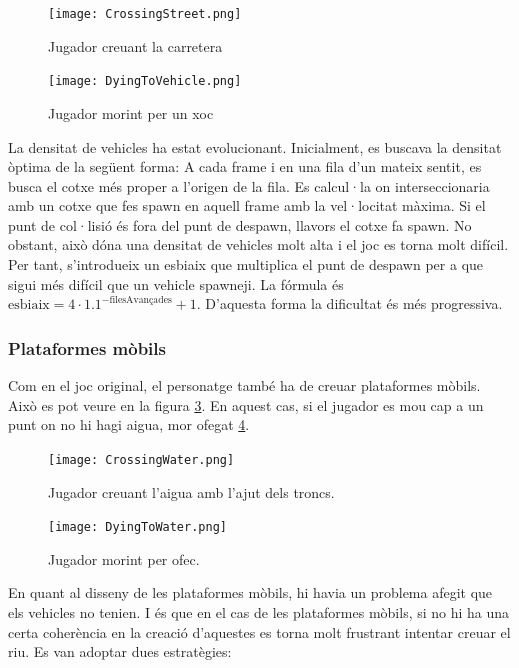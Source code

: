\documentclass{article}
\begin{document}
\begin{figure}[h!]
	\texttt{[image: CrossingStreet.png]}
	\caption{Jugador creuant la carretera}
	\label{creuantCarretera}
\end{figure}

\begin{figure}[h!]
	\texttt{[image: DyingToVehicle.png]}
	\caption{Jugador morint per un xoc}
	\label{morintCarretera}
\end{figure}

La densitat de vehicles ha estat evolucionant. Inicialment, es buscava
la densitat òptima de la següent forma: A cada frame i en una fila d'un
mateix sentit, es busca el cotxe més proper a l'origen de la fila.
Es calcul·la on interseccionaria amb un cotxe que fes spawn en aquell frame
amb la vel·locitat màxima. Si el punt de col·lisió és fora del punt
de despawn, llavors el cotxe fa spawn.
No obstant, això dóna una densitat de vehicles molt alta i el joc es
torna molt difícil. Per tant, s'introdueix un esbiaix que multiplica
el punt de despawn per a que sigui més difícil que un vehicle spawneji.
La fórmula és $\text{esbiaix} = 4 \cdot {1.1}^{-\text{filesAvançades}} + 1$.
D'aquesta forma la dificultat és més progressiva.

\subsubsection{Plataformes mòbils}

Com en el joc original, el personatge també ha de creuar plataformes mòbils.
Això es pot veure en la figura \ref{creuantAigua}. En aquest cas,
si el jugador es mou cap a un punt on no hi hagi aigua, mor ofegat 
\ref{morintAigua}.

\begin{figure}[h!]
	\texttt{[image: CrossingWater.png]}
	\caption{Jugador creuant l'aigua amb l'ajut dels troncs.}
	\label{creuantAigua}
\end{figure}

\begin{figure}[h!]
	\texttt{[image: DyingToWater.png]}
	\caption{Jugador morint per ofec.}
	\label{morintAigua}
\end{figure}

En quant al disseny de les plataformes mòbils, hi havia un problema
afegit que els vehicles no tenien. I és que en el cas de les plataformes
mòbils, si no hi ha una certa coherència en la creació d'aquestes
es torna molt frustrant intentar creuar el riu. Es van adoptar dues
estratègies:
\end{document}
